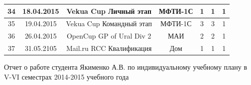 \documentclass[a4paper,12pt]{article}
\begin{document}
\begin{table}[h]
\begin{tabular}{|c|c|c|c|c|c|c|}
34 & 18.04.2015 & Vekua Cup Личный этап & МФТИ-1С & 1 & 1 & 1 \\ \hline

35 & 19.04.2015 & Vekua Cup Командный этап & МФТИ-1С & 3 & 3 & 1 \\ \hline

36 & 26.04.2015 & OpenCup GP of Ural Div 2 & МАИ & 2 & 2 & 1 \\ \hline

37 & 31.05.2105 & Mail.ru RCC Квалификация & Дом & 1 & 1 & 1 \\ \hline

\end{tabular}
\end{table}

\vfill


Отчет о работе студента Якименко А.В. по индивидуальному учебному плану в V-VI семестрах 2014-2015 учебного года
\end{document}
